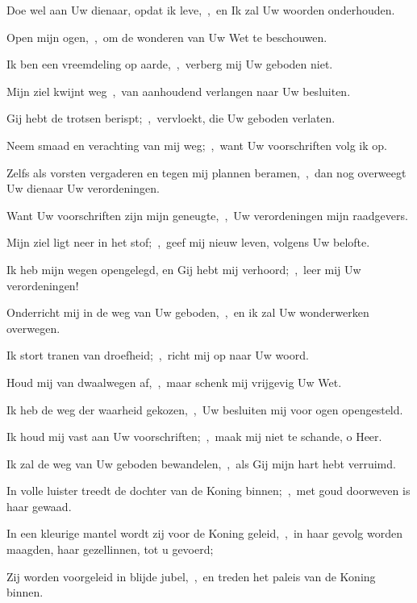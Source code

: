 \documentclass[12pt,twoside,a5paper]{article}
\begin{document}
\begin{halfparskip}
   

  Doe wel aan Uw dienaar, opdat ik leve,~\sep\ en Ik zal Uw woorden onderhouden.


  Open mijn ogen,~\sep\ om de wonderen van Uw Wet te beschouwen.

  Ik ben een vreemdeling op aarde,~\sep\ verberg mij Uw geboden niet.

  Mijn ziel kwijnt weg~\sep\ van aanhoudend verlangen naar Uw besluiten.

  Gij hebt de trotsen berispt;~\sep\ vervloekt, die Uw geboden verlaten.

  Neem smaad en verachting van mij weg;~\sep\ want Uw voorschriften volg ik op.

  Zelfs als vorsten vergaderen en tegen mij plannen beramen,~\sep\ dan nog overweegt Uw dienaar Uw verordeningen.

  Want Uw voorschriften zijn mijn geneugte,~\sep\ Uw verordeningen mijn raadgevers.

  Mijn ziel ligt neer in het stof;~\sep\ geef mij nieuw leven, volgens Uw belofte.

  Ik heb mijn wegen opengelegd, en Gij hebt mij verhoord;~\sep\ leer mij Uw verordeningen!

  Onderricht mij in de weg van Uw geboden,~\sep\ en ik zal Uw wonderwerken overwegen.

  Ik stort tranen van droefheid;~\sep\ richt mij op naar Uw woord.

  Houd mij van dwaalwegen af,~\sep\ maar schenk mij vrijgevig Uw Wet.

  Ik heb de weg der waarheid gekozen,~\sep\ Uw besluiten mij voor ogen opengesteld.

  Ik houd mij vast aan Uw voorschriften;~\sep\ maak mij niet te schande, o Heer.

  Ik zal de weg van Uw geboden bewandelen,~\sep\ als Gij mijn hart hebt verruimd.
\end{halfparskip}

\begin{halfparskip}
   

  In volle luister treedt de dochter van de Koning binnen;~\sep\ met goud doorweven is haar gewaad.


  In een kleurige mantel wordt zij voor de Koning geleid,~\sep\ in haar gevolg worden maagden, haar gezellinnen, tot u gevoerd;

  Zij worden voorgeleid in blijde jubel,~\sep\ en treden het paleis van de Koning binnen.
\end{halfparskip}
\end{document}
